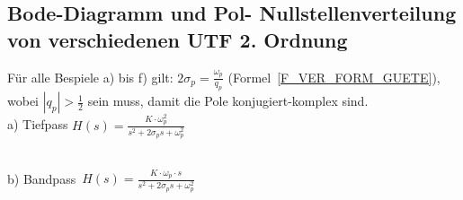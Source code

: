 {\subsection{Bode-Diagramm und Pol- Nullstellenverteilung von verschiedenen UTF 2. Ordnung}\label{Z_VER_KAP_BSP}
F\"ur alle Bespiele a) bis f) gilt: $2\sigma_p=\frac{\omega_p}{q_p}$ (Formel~\ref{F_VER_FORM_GUETE}), wobei $|q_p|>\frac{1}{2}$ sein muss, damit die Pole konjugiert-komplex sind.\\
a) Tiefpass {\large $H(s)=\frac{K\cdot\omega_p^2}{s^2+2\sigma_p s+\omega_p^2}$}~\\
\begin{figure}[!htb]
\vspace*{-0.5cm}
\begin{center}
\end{center}
\end{figure}~~\\
b) Bandpass~{\large $H(s)=\frac{K\cdot \omega_p\cdot s}{s^2+2\sigma_p s+\omega_p^2}$}\\
\begin{figure}[!htb]
\vspace*{-0.5cm}
\begin{center}
\end{center}
\end{figure}~
  
 


\newpage 
\begin{figure}[!htb]
\vspace*{0cm}
\begin{center}
\end{center}
\vspace*{-6mm}
\end{figure}
\newpage
\begin{figure}[!htb]
\vspace*{0cm}
\begin{center}
\end{center}
\vspace*{-6mm}
\end{figure}
\clearpage
\newpage
}
